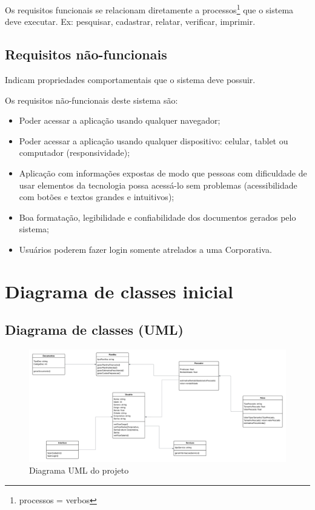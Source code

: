 \documentclass[a4paper]{abntex2}
\begin{document}
Os requisitos funcionais se relacionam diretamente a processos\footnote{processos = verbos} que o sistema deve executar. Ex: pesquisar, cadastrar, relatar, verificar, imprimir.

\subsection{Requisitos não-funcionais}

Indicam propriedades comportamentais que o sistema deve possuir.

Os requisitos não-funcionais deste sistema são:

\begin{itemize}
    \item Poder acessar a aplicação usando qualquer navegador;
    \item Poder acessar a aplicação usando qualquer dispositivo: celular, tablet ou computador (responsividade);
    \item Aplicação com informações expostas de modo que pessoas com dificuldade de usar elementos da tecnologia possa acessá-lo sem problemas (acessibilidade com botões e textos grandes e intuitivos);
    \item Boa formatação, legibilidade e confiabilidade dos documentos gerados pelo sistema;
    \item Usuários poderem fazer login somente atrelados a uma Corporativa.
\end{itemize}

\section{Diagrama de classes inicial}

\subsection{Diagrama de classes (UML)}

\begin{figure}[H]
    \centering
    \includegraphics[width=1\linewidth]{imagens/UML POO DEV.png}
    \caption{Diagrama UML do projeto}
    \label{fig:uml-projeto}
\end{figure}
\end{document}
